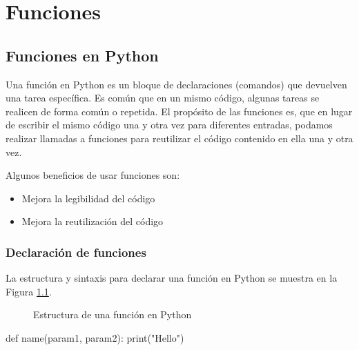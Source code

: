 \chapter{Funciones}

\setcounter{ipythcntr}{0}

\section{Funciones en Python}
Una función en Python es un bloque de declaraciones (comandos) que devuelven una tarea específica. Es común que en un mismo código, algunas tareas se realicen de forma común o repetida. El propósito de las funciones es, que en lugar de escribir el mismo código una y otra vez para diferentes entradas, podamos realizar llamadas a funciones para reutilizar el código contenido en ella una y otra vez.

Algunos beneficios de usar funciones son:
\begin{itemize}
    \item Mejora la legibilidad del código
    \item Mejora la reutilización del código
\end{itemize}

\subsection{Declaración de funciones}
La estructura y sintaxis para declarar una función en Python se muestra en la Figura \ref{fig:func-structure}.

\begin{figure}[htb]
    \centering
    
    \caption{Estructura de una función en Python}
    \label{fig:func-structure}
\end{figure}


\begin{pyin}
def name(param1, param2):
    print("Hello")
\end{pyin}